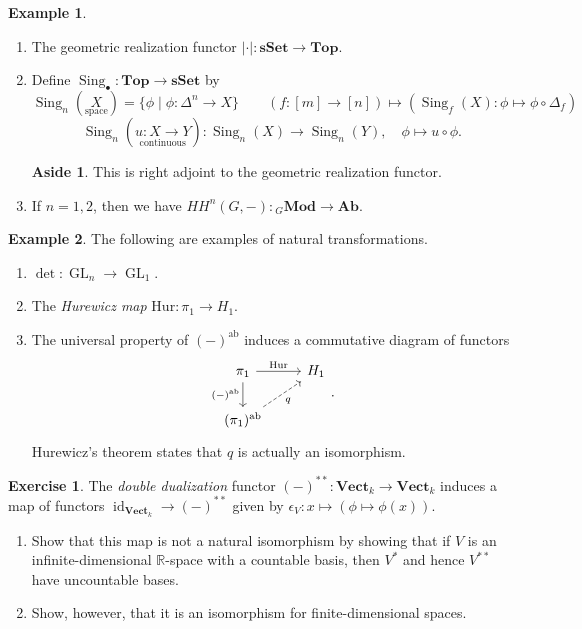 \documentclass[10pt,letterpaper,cm]{nupset}
\theoremstyle{definition}
\newtheorem{exmp}{Example}
\newtheorem*{aside}{Aside}
\newtheorem{remark}{Remark}
\newtheorem{exercise}{Exercise}
\newcommand{\R}{\mathbb R}
\newcommand{\1}{\mathbf{1}}
\newcommand{\0}{\vec 0}
\DeclareMathOperator*{\GL}{GL}
\DeclareMathOperator{\id}{id}
\DeclareMathOperator{\ab}{ab}
\DeclareMathOperator{\Sing}{Sing}
\begin{document}
\begin{exmp}
\begin{enumerate}
Alternatively, say that an element  $x\in X_n$ is \textit{nondegenerate} if it is not of the form $x =s_i(y)$ for any $1\leq i \leq n-1$ and $y\in X_{n-1}$ and define $(S)_{\bullet}$ as the unique simplicial set such that $S_n^{\text{nd}} = \begin{cases}
S & n =0 \\ \emptyset & n > 0 \end{cases}.$
\begin{remark}
Note that $|(S)_{\bullet}|$ is homotopy equivalent to $S$ equipped with the discrete topology. 
\end{remark}
\item The geometric realization functor $|\cdot | : \mathbf{sSet} \to \mathbf{Top}$.
\item Define $\Sing_{\bullet} : \mathbf{Top} \to \mathbf{sSet}$ by
$$ \Sing_n(\underset{\text{space}}{X}) = \{\phi \mid \phi  : \Delta^n \to X\} \quad \quad (f: [m] \to [n]) \mapsto (\Sing_f(X) : \phi \mapsto \phi \circ \Delta_f)$$
$$ \Sing_n(\underset{\text{continuous}}{u : X \to Y}) : \Sing_n(X) \to \Sing_n(Y), \quad \phi \mapsto u \circ \phi.$$
\begin{aside} This is right adjoint to the geometric realization functor. \end{aside}
\item If $n=1,2$, then we have $HH^n(G, -) : {}_{G}\mathbf{Mod} \to \mathbf{Ab}$.
\end{enumerate}
\end{exmp}

\begin{exmp} The following are examples of natural transformations.
\begin{enumerate}
\item $\det : \GL_n \to \GL_1$.
\item The \textit{Hurewicz map} $\text{Hur}: \pi_1 \to H_1$. 
\item The universal property of $(-)^{\ab}$ induces a commutative diagram of functors
\[
\begin{tikzcd}
\pi_1 \arrow[r, "\text{Hur}"] \arrow[d, "(-)^{\ab}"'] & H_1 \\
(\pi_1)^{\ab} \arrow[ru, "q"', dashed] & 
\end{tikzcd}
.\] Hurewicz's theorem states that $q$ is actually an isomorphism.
\end{enumerate}
\end{exmp}

\begin{exercise} The \textit{double dualization} functor $(-)^{\ast \ast}: \mathbf{Vect}_k \to \mathbf{Vect}_k$ induces a map of functors $\id_{\mathbf{Vect}_k} \to (-)^{\ast \ast}$ given by $\epsilon_V : x \mapsto (\phi \mapsto \phi(x))$.
\begin{enumerate}
\item Show that this map is not a natural isomorphism by showing that if $V$ is an infinite-dimensional $\R$-space with a countable basis, then $V^{\ast}$ and hence $V^{\ast \ast}$ have uncountable bases.
\item Show, however, that it is an isomorphism for finite-dimensional spaces.
\end{enumerate}
\end{exercise}
\end{document}
